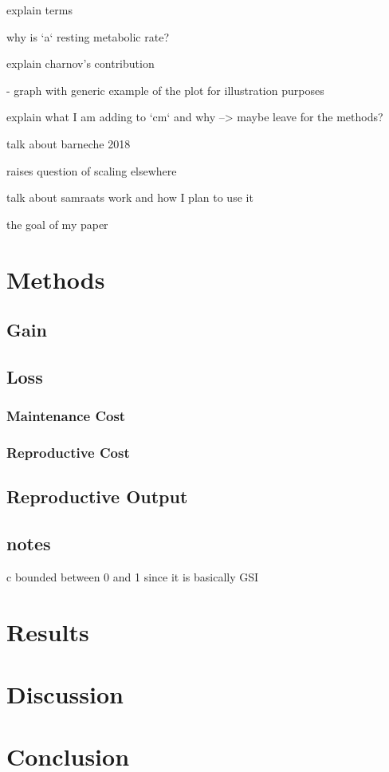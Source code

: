 \documentclass[a4paper, hidelinks]{article} %
\begin{document}
	explain terms 
	
	why is `a` resting metabolic rate?
	
	explain charnov's contribution
	
	- graph with generic example of the plot for illustration purposes
	
	explain what I am adding to `cm` and why --> maybe leave for the methods?
	
	talk about barneche 2018
	
	raises question of scaling elsewhere 
	
	talk about samraats work and how I plan to use it
	
	the goal of my paper
	
	\nolinenumbers
\section{Methods}
	\linenumbers
	\subsection{Gain}
	
	\subsection{Loss}
	\subsubsection{Maintenance Cost}
	\subsubsection{Reproductive Cost}
	\subsection{Reproductive Output}
	
	\subsection{notes}
	c bounded between 0 and 1 since it is basically GSI
	\nolinenumbers
\section{Results}
	\linenumbers
	
	\nolinenumbers
\section{Discussion}
	\linenumbers
	
	\nolinenumbers
\section{Conclusion}
	\linenumbers
	
	\nolinenumbers
	\newpage
	
\printbibliography
\end{document}
